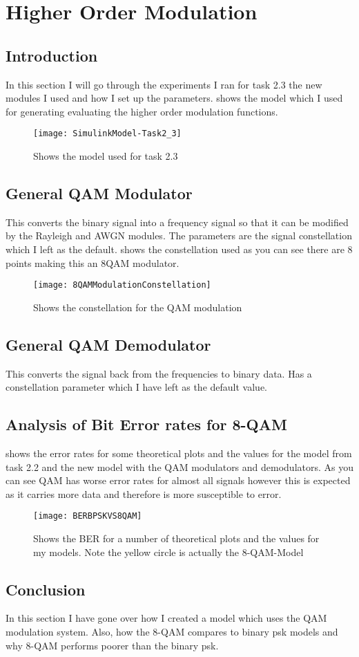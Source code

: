 \section{Higher Order Modulation}{
	\subsection{Introduction}
	{
		In this section I will go through the experiments I ran for task 2.3 the new modules I used and how I set up the parameters.  shows the model which I used for generating evaluating the higher order modulation functions.
		\begin{figure}
			\centering
			\texttt{[image: SimulinkModel-Task2\_3]}
			\caption{Shows the model used for task 2.3}
			\label{fig:2.3SimlinkModel}
		\end{figure}
	}
	\subsection{General QAM Modulator}
	{
		This converts the binary signal into a frequency signal so that it can be modified by the Rayleigh and AWGN modules. The parameters are the signal constellation which I left as the default.  shows the constellation used as you can see there are 8 points making this an 8QAM modulator.
		\begin{figure}
			\centering
			\texttt{[image: 8QAMModulationConstellation]}
			\caption{Shows the constellation for the QAM modulation}
			\label{fig:8QAMModulationConsetllation}
		\end{figure}
	}
	
	\subsection{General QAM Demodulator}
	{
		This converts the signal back from the frequencies to binary data. Has a constellation parameter which I have left as the default value.
	}
	\subsection{Analysis of Bit Error rates for 8-QAM}
	{
		 shows the error rates for some theoretical plots and the values for the model from task 2.2 and the new model with the QAM modulators and demodulators. As you can see QAM has worse error rates for almost all signals however this is expected as it carries more data and therefore is more susceptible to error.
		\begin{figure}
			\centering
			\texttt{[image: BERBPSKVS8QAM]}
			\caption{Shows the BER for a number of theoretical plots and the values for my models. Note the yellow circle is actually the 8-QAM-Model}
			\label{fig:BERBPSKVS8QAM}
		\end{figure}
	}
	\subsection{Conclusion}
	{
		In this section I have gone over how I created a model which uses the QAM modulation system. Also, how the 8-QAM compares to binary psk models and why 8-QAM performs poorer than the binary psk.
	}
}
